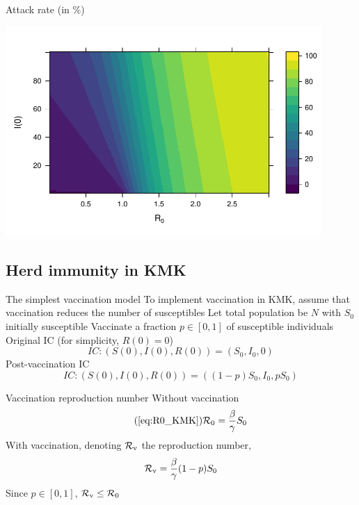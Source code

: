 \documentclass[aspectratio=169]{beamer}\usepackage[]{graphicx}\usepackage[]{xcolor}
\begin{document}
\begin{frame}{Attack rate (in \%)}
  \begin{center}
    \includegraphics[width=0.9\textwidth]{FIGS/course-01-KMK_attack_rate-1.pdf}
  \end{center}
\end{frame}


\subsection{Herd immunity in KMK}


\begin{frame}{The simplest vaccination model}
To implement vaccination in KMK, assume that vaccination reduces the number of susceptibles
\vfill
Let total population be $N$ with $S_0$ initially susceptible
\vfill
Vaccinate a fraction $p\in[0,1]$ of susceptible individuals
\vfill
Original IC (for simplicity, $R(0)=0$)
\begin{equation}\label{eq:IC_KMK_novacc}
IC: (S(0),I(0),R(0)) = (S_0,I_0,0)
\end{equation}
Post-vaccination IC 
\begin{equation}\label{eq:IC_KMK_vacc}
IC: (S(0),I(0),R(0)) = ((1-p)S_0,I_0,pS_0)
\end{equation}
\end{frame}


\begin{frame}{Vaccination reproduction number}
  Without vaccination
  \begin{equation}\tag{\ref{eq:R0_KMK}}
    \R_0=\frac{\beta}{\gamma}S_0
  \end{equation}
  \vfill
  With vaccination, denoting $\mathcal{R}_{\text{v}}$ the reproduction number,
  \begin{equation}
    \mathcal{R}_{\text{v}} = \frac{\beta}{\gamma}(1-p)S_0
  \end{equation}
  \vfill
  Since $p\in[0,1]$, $\mathcal{R}_{\text{v}}\leq\mathcal{R}_0$
\end{frame}
\end{document}
